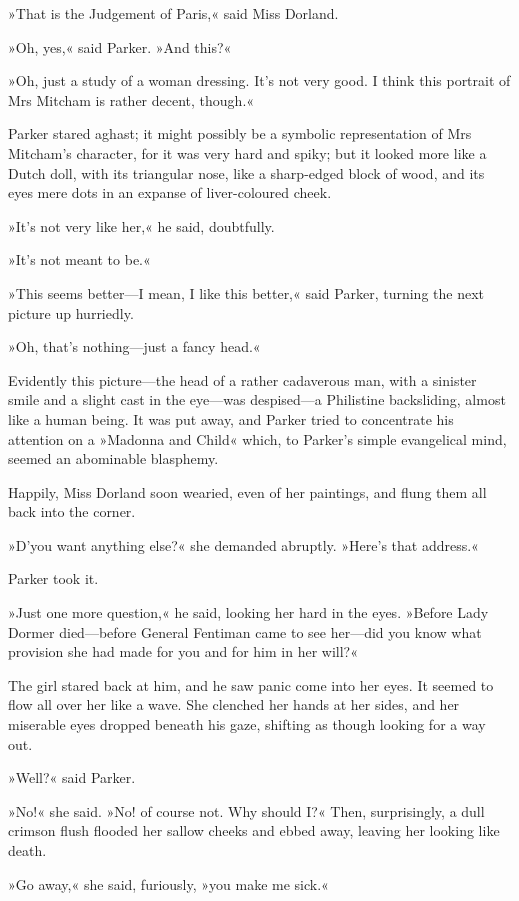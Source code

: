 »That is the Judgement of Paris,« said Miss Dorland.

»Oh, yes,« said Parker. »And this?«

»Oh, just a study of a woman dressing. It's not very good. I think this portrait of Mrs Mitcham is rather decent, though.«

Parker stared aghast; it might possibly be a symbolic representation of Mrs Mitcham's character, for it was very hard and spiky; but it looked more like a Dutch doll, with its triangular nose, like a sharp-edged block of wood, and its eyes mere dots in an expanse of liver-coloured cheek.

»It's not very like her,« he said, doubtfully.

»It's not meant to be.«

»This seems better—I mean, I like this better,« said Parker, turning the next picture up hurriedly.

»Oh, that's nothing—just a fancy head.«

Evidently this picture—the head of a rather cadaverous man, with a sinister smile and a slight cast in the eye—was despised—a Philistine backsliding, almost like a human being. It was put away, and Parker tried to concentrate his attention on a »Madonna and Child« which, to Parker's simple evangelical mind, seemed an abominable blasphemy.

Happily, Miss Dorland soon wearied, even of her paintings, and flung them all back into the corner.

»D'you want anything else?« she demanded abruptly. »Here's that address.«

Parker took it.

»Just one more question,« he said, looking her hard in the eyes. »Before Lady Dormer died—before General Fentiman came to see her—did you know what provision she had made for you and for him in her will?«

The girl stared back at him, and he saw panic come into her eyes. It seemed to flow all over her like a wave. She clenched her hands at her sides, and her miserable eyes dropped beneath his gaze, shifting as though looking for a way out.

»Well?« said Parker.

»No!« she said. »No! of course not. Why should I?« Then, surprisingly, a dull crimson flush flooded her sallow cheeks and ebbed away, leaving her looking like death.

»Go away,« she said, furiously, »you make me sick.«